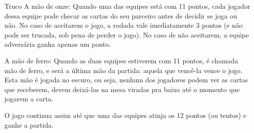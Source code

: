 \begin{subsecao}{Truco}
A mão de onze: Quando uma das equipes está com 11 pontos, cada jogador dessa
equipe pode checar as cartas do seu parceiro antes de decidir se joga ou não.
No caso de aceitarem o jogo, a rodada vale imediatamente 3 pontos (e não pode
ser trucada, sob pena de perder o jogo). No caso de não aceitarem, a equipe
adversária ganha apenas um ponto. 

A mão de ferro: Quando as duas equipes estiverem com 11 pontos, é chamada
mão de ferro, e será a última mão da partida: aquela que vencê-la
vence o jogo. Esta mão é jogada no escuro, ou seja, nenhum dos jogadores
podem ver as cartas que receberem, devem deixá-las na mesa viradas
pra baixo até o momento que jogarem a carta. 

O jogo continua assim até que uma das equipes atinja os 12 pontos (ou tentos) e
ganhe a partida. 

\end{subsecao}
